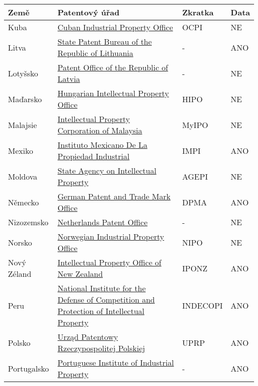 	\begin{table}[H]
	\centering
	\begin{tabular}{|>{\centering\arraybackslash}p{2.2cm}|>{\centering\arraybackslash}p{7cm}|>{\centering\arraybackslash}p{2cm}|>{\centering\arraybackslash}p{1cm}|} 
	\hline
	\textbf{Země}    & \textbf{Patentový úřad} & \textbf{Zkratka}        & \textbf{Data}        \\ 
	\hline
	Kuba & \href{http://www.ocpi.cu}{Cuban Industrial Property Office}  & OCPI   & NE      \\ 
	\hline
	Litva & \href{http://vpb.lrv.lt/en/}{State Patent Bureau of the Republic of Lithuania}  & -    & ANO     \\
	\hline
 	Lotyšsko & \href{https://www.lrpv.gov.lv/lv}{Patent Office of the Republic of Latvia}  & -    & NE     \\ 
	\hline
	Maďarsko & \href{http://www.hipo.gov.hu/}{Hungarian Intellectual Property Office}  & HIPO   & NE      \\ 
	\hline
	Malajsie & \href{http://www.myipo.gov.my/}{Intellectual Property Corporation of Malaysia}  & MyIPO  & NE       \\ 
	\hline
	Mexiko & \href{https://www.gob.mx/impi/en}{Instituto Mexicano De La Propiedad Industrial}  & IMPI  & ANO       \\ 
	\hline
	Moldova & \href{http://www.agepi.gov.md/}{State Agency on Intellectual Property}  & AGEPI   & NE      \\ 
	\hline
	Německo & \href{http://www.dpma.de/}{German Patent and Trade Mark Office}  & DPMA   & ANO      \\ 
	\hline
	Nizozemsko & \href{http://www.rvo.nl/octrooien}{Netherlands Patent Office}  & -    & NE    \\ 
	\hline
	Norsko & \href{https://www.patentstyret.no/en/}{Norwegian Industrial Property Office}  & NIPO    & NE     \\ 
	\hline
	Nový Zéland & \href{http://www.iponz.govt.nz/}{Intellectual Property Office of New Zealand}  & IPONZ   & ANO      \\ 
	\hline
	Peru & \href{http://www.indecopi.gob.pe/}{National Institute for the Defense of Competition and Protection of Intellectual Property}  & INDECOPI    & ANO     \\ 
	\hline
	Polsko & \href{https://uprp.gov.pl/pl}{Urząd Patentowy Rzeczypospolitej Polskiej}  & UPRP    & ANO     \\ 
	\hline
	Portugalsko & \href{https://inpi.justica.gov.pt/}{Portuguese Institute of Industrial Property}  & -     & ANO    \\ 

\end{tabular}
\end{table}
